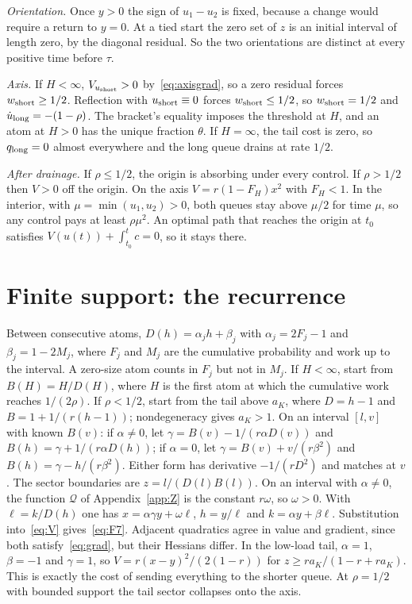 \documentclass[11pt]{article}
\numberwithin{equation}{section}
\theoremstyle{definition}
\theoremstyle{remark}
\begin{document}
\emph{Orientation.} Once $y>0$ the sign of $u_1-u_2$ is fixed, because a change would require a return to $y=0$. At a tied start the zero set of $z$ is an initial interval of length zero, by the diagonal residual. So the two orientations are distinct at every positive time before $\tau$.

\emph{Axis.} If $H<\infty$, $V_{u_{\rm short}}>0$ by~\eqref{eq:axisgrad}, so a zero residual forces $w_{\rm short}\ge1/2$. Reflection with $u_{\rm short}\equiv0$ forces $w_{\rm short}\le1/2$, so $w_{\rm short}=1/2$ and $\dot u_{\rm long}=-(1-\rho)$. The bracket's equality imposes the threshold at $H$, and an atom at $H>0$ has the unique fraction $\theta$. If $H=\infty$, the tail cost is zero, so $q_{\rm long}=0$ almost everywhere and the long queue drains at rate $1/2$.

\emph{After drainage.} If $\rho\le1/2$, the origin is absorbing under every control. If $\rho>1/2$ then $V>0$ off the origin. On the axis $V=r(1-F_H)x^2$ with $F_H<1$. In the interior, with $\mu=\min(u_1,u_2)>0$, both queues stay above $\mu/2$ for time $\mu$, so any control pays at least $\rho\mu^2$. An optimal path that reaches the origin at $t_0$ satisfies $V(u(t))+\int_{t_0}^tc=0$, so it stays there.

\section{Finite support: the recurrence}\label{app:finite}

Between consecutive atoms, $D(h)=\alpha_jh+\beta_j$ with $\alpha_j=2F_j-1$ and $\beta_j=1-2M_j$, where $F_j$ and $M_j$ are the cumulative probability and work up to the interval. A zero-size atom counts in $F_j$ but not in $M_j$. If $H<\infty$, start from $B(H)=H/D(H)$, where $H$ is the first atom at which the cumulative work reaches $1/(2\rho)$. If $\rho<1/2$, start from the tail above $a_K$, where $D=h-1$ and $B=1+1/(r(h-1))$; nondegeneracy gives $a_K>1$. On an interval $[l,v]$ with known $B(v)$: if $\alpha\ne0$, let $\gamma=B(v)-1/(r\alpha D(v))$ and $B(h)=\gamma+1/(r\alpha D(h))$; if $\alpha=0$, let $\gamma=B(v)+v/(r\beta^2)$ and $B(h)=\gamma-h/(r\beta^2)$. Either form has derivative $-1/(rD^2)$ and matches at $v$. The sector boundaries are $z=l/(D(l)B(l))$. On an interval with $\alpha\ne0$, the function $\mathcal Q$ of Appendix~\ref{app:Z} is the constant $r\omega$, so $\omega>0$. With $\ell=k/D(h)$ one has $x=\alpha\gamma y+\omega\ell$, $h=y/\ell$ and $k=\alpha y+\beta\ell$. Substitution into~\eqref{eq:V} gives~\eqref{eq:F7}. Adjacent quadratics agree in value and gradient, since both satisfy~\eqref{eq:grad}, but their Hessians differ. In the low-load tail, $\alpha=1$, $\beta=-1$ and $\gamma=1$, so $V=r(x-y)^2/(2(1-r))$ for $z\ge ra_K/(1-r+ra_K)$. This is exactly the cost of sending everything to the shorter queue. At $\rho=1/2$ with bounded support the tail sector collapses onto the axis.
\end{document}
